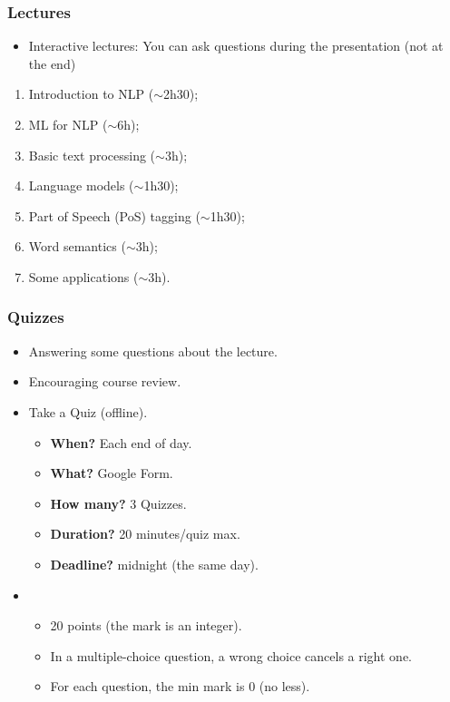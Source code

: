 \documentclass{beamer}
\begin{document}
\begin{frame}
\frametitle{Lectures}

\begin{itemize}
	\item Interactive lectures: You can ask questions during the presentation (not at the end)
\end{itemize}

\begin{enumerate}
	\item Introduction to NLP ($\sim$2h30);
	\item ML for NLP ($\sim$6h);
	\item Basic text processing ($\sim$3h);
	\item Language models ($\sim$1h30);
	\item Part of Speech (PoS) tagging ($\sim$1h30);
	\item Word semantics ($\sim$3h);
	\item Some applications ($\sim$3h).
\end{enumerate}

\end{frame}

\begin{frame}
	\frametitle{Quizzes}
	
	\begin{itemize}
		\item Answering some questions about the lecture.
		\item {} Encouraging course review.
		\item {} Take a Quiz (offline).
		\begin{itemize}
			\item \textbf{When?} Each end of day.
			\item \textbf{What?} Google Form.
			\item \textbf{How many?} 3 Quizzes.
			\item \textbf{Duration?} 20 minutes/quiz max.
			\item \textbf{Deadline?} midnight (the same day).
		\end{itemize}
		\item {}
		\begin{itemize}
			\item 20 points (the mark is an integer).
			\item In a multiple-choice question, a wrong choice cancels a right one.
			\item For each question, the min mark is 0 (no less).
		\end{itemize}
	\end{itemize}
	
\end{frame}
\end{document}
